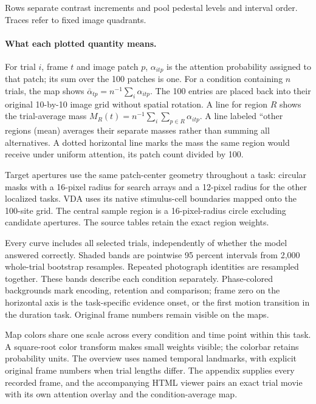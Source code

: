 \documentclass[11pt]{article}
\begin{document}
Rows separate contrast increments and pool pedestal levels and interval order. Traces refer to fixed image quadrants.

\paragraph{What each plotted quantity means.}
For trial $i$, frame $t$ and image patch $p$, $\alpha_{itp}$ is the attention probability assigned to that patch; its sum over the 100 patches is one. For a condition containing $n$ trials, the map shows $\bar\alpha_{tp}=n^{-1}\sum_i\alpha_{itp}$. The 100 entries are placed back into their original 10-by-10 image grid without spatial rotation. A line for region $R$ shows the trial-average mass $M_R(t)=n^{-1}\sum_i\sum_{p\in R}\alpha_{itp}$. A line labeled ``other regions (mean) averages their separate masses rather than summing all alternatives. A dotted horizontal line marks the mass the same region would receive under uniform attention, its patch count divided by 100.

Target apertures use the same patch-center geometry throughout a task: circular masks with a 16-pixel radius for search arrays and a 12-pixel radius for the other localized tasks. VDA uses its native stimulus-cell boundaries mapped onto the 100-site grid. The central sample region is a 16-pixel-radius circle excluding candidate apertures. The source tables retain the exact region weights.

Every curve includes all selected trials, independently of whether the model answered correctly. Shaded bands are pointwise 95 percent intervals from 2,000 whole-trial bootstrap resamples. Repeated photograph identities are resampled together. These bands describe each condition separately. Phase-colored backgrounds mark encoding, retention and comparison; frame zero on the horizontal axis is the task-specific evidence onset, or the first motion transition in the duration task. Original frame numbers remain visible on the maps.

Map colors share one scale across every condition and time point within this task. A square-root color transform makes small weights visible; the colorbar retains probability units. The overview uses named temporal landmarks, with explicit original frame numbers when trial lengths differ. The appendix supplies every recorded frame, and the accompanying HTML viewer pairs an exact trial movie with its own attention overlay and the condition-average map.
\end{document}
